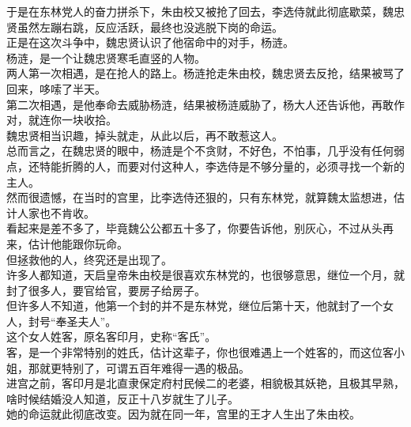\begin{multicols}{\theparacolNo}
于是在东林党人的奋力拼杀下，朱由校又被抢了回去，李选侍就此彻底歇菜，魏忠贤虽然左蹦右跳，反应活跃，最终也没逃脱下岗的命运。\\

正是在这次斗争中，魏忠贤认识了他宿命中的对手，杨涟。\\

杨涟，是一个让魏忠贤寒毛直竖的人物。\\

两人第一次相遇，是在抢人的路上。杨涟抢走朱由校，魏忠贤去反抢，结果被骂了回来，哆嗦了半天。\\

第二次相遇，是他奉命去威胁杨涟，结果被杨涟威胁了，杨大人还告诉他，再敢作对，就连你一块收拾。\\

魏忠贤相当识趣，掉头就走，从此以后，再不敢惹这人。\\

总而言之，在魏忠贤的眼中，杨涟是个不贪财，不好色，不怕事，几乎没有任何弱点，还特能折腾的人，而要对付这种人，李选侍是不够分量的，必须寻找一个新的主人。\\

然而很遗憾，在当时的宫里，比李选侍还狠的，只有东林党，就算魏太监想进，估计人家也不肯收。\\

看起来是差不多了，毕竟魏公公都五十多了，你要告诉他，别灰心，不过从头再来，估计他能跟你玩命。\\

但拯救他的人，终究还是出现了。\\

许多人都知道，天启皇帝朱由校是很喜欢东林党的，也很够意思，继位一个月，就封了很多人，要官给官，要房子给房子。\\

但许多人不知道，他第一个封的并不是东林党，继位后第十天，他就封了一个女人，封号“奉圣夫人”。\\

这个女人姓客，原名客印月，史称“客氏”。\\

客，是一个非常特别的姓氏，估计这辈子，你也很难遇上一个姓客的，而这位客小姐，那就更特别了，可谓五百年难得一遇的极品。\\

进宫之前，客印月是北直隶保定府村民候二的老婆，相貌极其妖艳，且极其早熟，啥时候结婚没人知道，反正十八岁就生了儿子。\\

她的命运就此彻底改变。因为就在同一年，宫里的王才人生出了朱由校。\\


\end{multicols}
